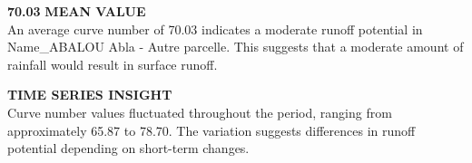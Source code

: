 \documentclass[12pt,a4paper]{article}
\begin{document}
\vspace{0.5cm}

\parbox{\textwidth}{ %
    \begin{minipage}[t]{0.48\textwidth}
        \vspace{0.3cm}
        \textbf{\Large{70.03}}
        \vspace{0.3cm}
        \textbf{MEAN VALUE}\\
        An average curve number of 70.03 indicates a moderate runoff potential in Name\_ABALOU Abla - Autre parcelle. This suggests that a moderate amount of rainfall would result in surface runoff.
        \vspace{0.5cm}

        \textbf{TIME SERIES INSIGHT}\\
        Curve number values fluctuated throughout the period, ranging from approximately 65.87 to 78.70. The variation suggests differences in runoff potential depending on short-term changes.
    \end{minipage}\hfill
    \begin{minipage}[t]{0.48\textwidth}
        \begin{center}
\end{center}
\end{minipage}}
\end{document}
